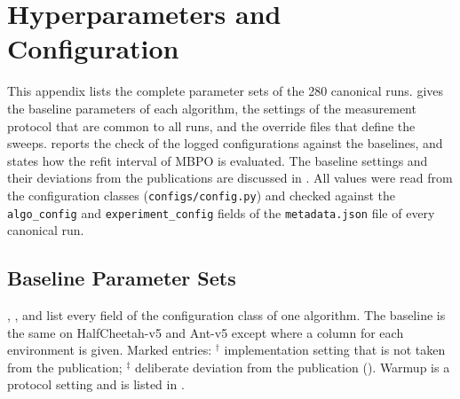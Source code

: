 \chapter{Hyperparameters and Configuration}
\label{app:hyperparameters}

This appendix lists the complete parameter sets of the \num{280} canonical runs.
 gives the baseline parameters of each algorithm,  the settings of the measurement protocol that are common to all runs, and  the override files that define the sweeps.
 reports the check of the logged configurations against the baselines, and  states how the refit interval of MBPO is evaluated.
The baseline settings and their deviations from the publications are discussed in .
All values were read from the configuration classes (\texttt{configs/\allowbreak config.py}) and checked against the \texttt{algo\_\allowbreak config} and \texttt{experiment\_\allowbreak config} fields of the \texttt{metadata.json} file of every canonical run.

\section{Baseline Parameter Sets}\label{sec:app-hp-baselines}

, ,  and  list every field of the configuration class of one algorithm.
The baseline is the same on HalfCheetah-v5 and Ant-v5 except where a column for each environment is given.
Marked entries: $^{\dagger}$ implementation setting that is not taken from the publication; $^{\ddagger}$ deliberate deviation from the publication ().
Warmup is a protocol setting and is listed in .

